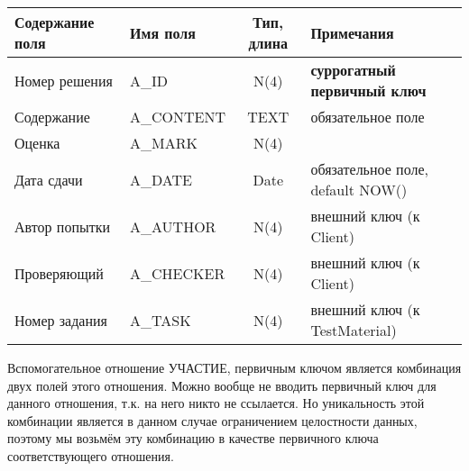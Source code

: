 \documentclass[a4paper,14pt]{article}
\begin{document}
\begin{table}[H]
	\begin{flushleft} 
	\end{flushleft}
\begin{adjustbox}{width=\linewidth}
	\begin{tabular}{|l|l|c|l|}
		\hline
		Содержание поля & Имя поля   & Тип, длина & Примечания                          \\ \hline
		Номер решения   & A\_ID      &    N(4)    & \textbf{суррогатный первичный ключ} \\ \hline
		Содержание      & A\_CONTENT &    TEXT    & обязательное поле                   \\ \hline
		Оценка          & A\_MARK    &    N(4)    &                                     \\ \hline
		Дата сдачи      & A\_DATE    &    Date    & обязательное поле, default NOW()    \\ \hline
		Автор попытки   & A\_AUTHOR  &    N(4)    & внешний ключ (к Client)               \\ \hline
		Проверяющий     & A\_CHECKER &    N(4)    & внешний ключ (к Client)               \\ \hline
		Номер задания   & A\_TASK    &    N(4)    & внешний ключ (к TestMaterial)       \\ \hline
	\end{tabular}
\end{adjustbox}
\end{table}


Вспомогательное отношение УЧАСТИЕ, первичным ключом является комбинация двух полей этого отношения. Можно вообще не вводить первичный ключ для данного отношения, т.к. на него никто не ссылается. Но уникальность этой комбинации является в данном случае ограничением целостности данных, поэтому мы возьмём эту комбинацию в качестве первичного ключа соответствующего отношения.
\end{document}
